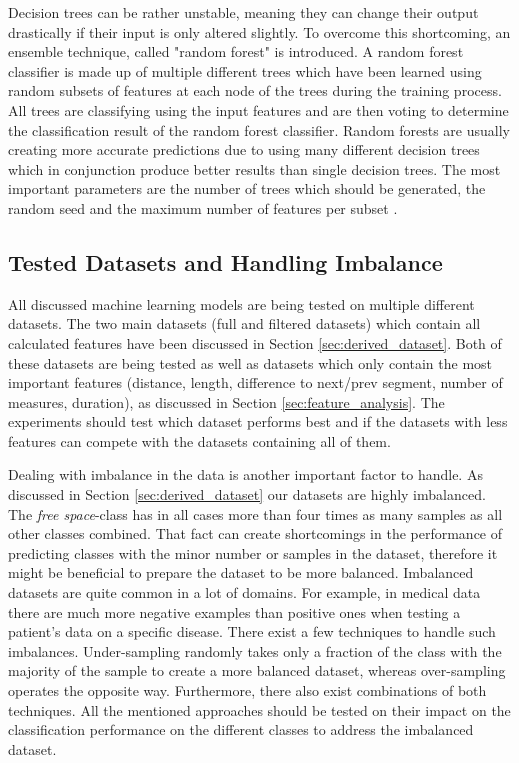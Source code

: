 Decision trees can be rather unstable, meaning they can change their output drastically if their input is only altered slightly. To overcome this shortcoming, an ensemble technique, called "random forest" is introduced. A random forest classifier is made up of multiple different trees which have been learned using random subsets of features at each node of the trees during the training process. All trees are classifying using the input features and are then voting to determine the classification result of the random forest classifier. Random forests are usually creating more accurate predictions due to using many different decision trees which in conjunction produce better results than single decision trees. The most important parameters are the number of trees which should be generated, the random seed and the maximum number of features per subset \cite{Hall2016_DataMining_ML}.





\subsection{Tested Datasets and Handling Imbalance}
\label{sec:tested_datasets_and_handling_imbalance}

All discussed machine learning models are being tested on multiple different datasets. The two main datasets (full and filtered datasets) which contain all calculated features have been discussed in Section \ref{sec:derived_dataset}. Both of these datasets are being tested as well as datasets which only contain the most important features (distance, length, difference to next/prev segment, number of measures, duration), as discussed in Section \ref{sec:feature_analysis}. The experiments should test which dataset performs best and if the datasets with less features can compete with the datasets containing all of them.

Dealing with imbalance in the data is another important factor to handle. As discussed in Section \ref{sec:derived_dataset} our datasets are highly imbalanced. The \emph{free space}-class has in all cases more than four times as many samples as all other classes combined. That fact can create shortcomings in the performance of predicting classes with the minor number or samples in the dataset, therefore it might be beneficial to prepare the dataset to be more balanced. Imbalanced datasets are quite common in a lot of domains. For example, in medical data there are much more negative examples than positive ones when testing a patient's data on a specific disease. There exist a few techniques to handle such imbalances. Under-sampling randomly takes only a fraction of the class with the majority of the sample to create a more balanced dataset, whereas over-sampling operates the opposite way. Furthermore, there also exist combinations of both techniques. All the mentioned approaches should be tested on their impact on the classification performance on the different classes to address the imbalanced dataset.




